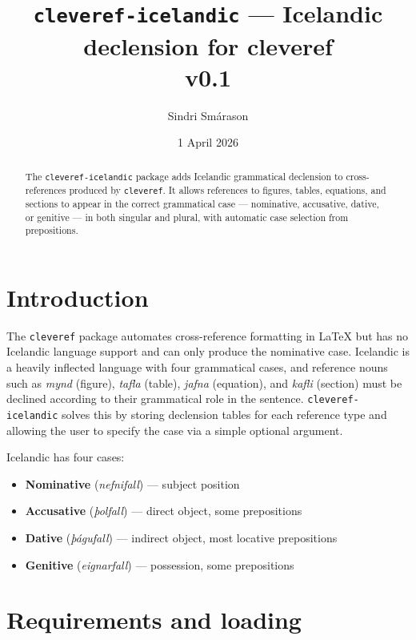 \documentclass{article}
\title{\texttt{cleveref-icelandic} --- Icelandic declension for cleveref\\
  \large v0.1}
\author{Sindri Smárason}
\date{1 April 2026}
\begin{document}
\maketitle

\begin{abstract}
  The \texttt{cleveref-icelandic} package adds Icelandic grammatical declension to
  cross-references produced by \texttt{cleveref}. It allows references
  to figures, tables, equations, and sections to appear in the correct
  grammatical case --- nominative, accusative, dative, or genitive ---
  in both singular and plural, with automatic case selection from
  prepositions.
\end{abstract}

\tableofcontents
\newpage

\section{Introduction}

The \texttt{cleveref} package automates cross-reference formatting in
LaTeX but has no Icelandic language support and can only produce the
nominative case. Icelandic is a heavily inflected language with four
grammatical cases, and reference nouns such as \textit{mynd} (figure),
\textit{tafla} (table), \textit{jafna} (equation), and \textit{kafli}
(section) must be declined according to their grammatical role in the
sentence. \texttt{cleveref-icelandic} solves this by storing declension tables for
each reference type and allowing the user to specify the case via a
simple optional argument.

Icelandic has four cases:
\begin{itemize}
  \item \textbf{Nominative} (\textit{nefnifall}) --- subject position
  \item \textbf{Accusative} (\textit{þolfall}) --- direct object, some prepositions
  \item \textbf{Dative} (\textit{þágufall}) --- indirect object, most locative prepositions
  \item \textbf{Genitive} (\textit{eignarfall}) --- possession, some prepositions
\end{itemize}

\section{Requirements and loading}
\end{document}
